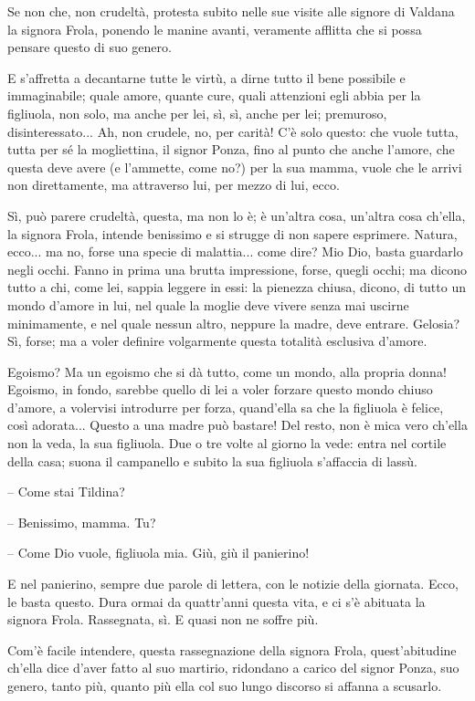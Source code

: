 \documentclass[12pt]{book}
\begin{document}
Se non che, non crudeltà, protesta subito nelle sue visite alle signore di Valdana la signora Frola, ponendo le manine avanti, veramente afflitta che si possa pensare questo di suo genero.

 E s’affretta a decantarne tutte le virtù, a dirne tutto il bene possibile e immaginabile; quale amore, quante cure, quali attenzioni egli abbia per la figliuola, non solo, ma anche per lei, sì, sì, anche per lei; premuroso, disinteressato... Ah, non crudele, no, per carità! C’è solo questo: che vuole tutta, tutta per sé la mogliettina, il signor Ponza, fino al punto che anche l’amore, che questa deve avere (e l’ammette, come no?) per la sua mamma, vuole che le arrivi non direttamente, ma attraverso lui, per mezzo di lui, ecco.
 
  Sì, può parere crudeltà, questa, ma non lo è; è un’altra cosa, un’altra cosa ch’ella, la signora Frola, intende benissimo e si strugge di non sapere esprimere. Natura, ecco... ma no, forse una specie di malattia... come dire? Mio Dio, basta guardarlo negli occhi. Fanno in prima una brutta impressione, forse, quegli occhi; ma dicono tutto a chi, come lei, sappia leggere in essi: la pienezza chiusa, dicono, di tutto un mondo d’amore in lui, nel quale la moglie deve vivere senza mai uscirne minimamente, e nel quale nessun altro, neppure la madre, deve entrare. Gelosia? Sì, forse; ma a voler definire volgarmente questa totalità esclusiva d’amore.
  
Egoismo? Ma un egoismo che si dà tutto, come un mondo, alla propria donna! Egoismo, in fondo, sarebbe quello di lei a voler forzare questo mondo chiuso d’amore, a volervisi introdurre per forza, quand’ella sa che la figliuola è felice, così adorata... Questo a una madre può bastare! Del resto, non è mica vero ch’ella non la veda, la sua figliuola. Due o tre volte al giorno la vede: entra nel cortile della casa; suona il campanello e subito la sua figliuola s’affaccia di lassù.

– Come stai Tildina?

– Benissimo, mamma. Tu?

– Come Dio vuole, figliuola mia. Giù, giù il panierino!

E nel panierino, sempre due parole di lettera, con le notizie della giornata. Ecco, le basta questo. Dura ormai da quattr’anni questa vita, e ci s’è abituata la signora Frola. Rassegnata, sì. E quasi non ne soffre più.

Com’è facile intendere, questa rassegnazione della signora Frola, quest’abitudine ch’ella dice d’aver fatto al suo martirio, ridondano a carico del signor Ponza, suo genero, tanto più, quanto più ella col suo lungo discorso si affanna a scusarlo.
\end{document}
